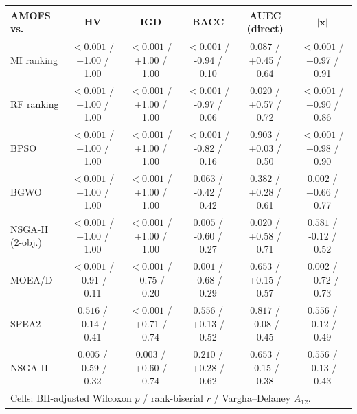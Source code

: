 \begin{tabular}{lccccc}
\toprule
AMOFS vs. & HV & IGD & BACC & AUEC (direct) & $|\mathbf{x}|$ \\
\midrule
MI ranking & $<\!0.001$ / +1.00 / 1.00 & $<\!0.001$ / +1.00 / 1.00 & $<\!0.001$ / -0.94 / 0.10 & $0.087$ / +0.45 / 0.64 & $<\!0.001$ / +0.97 / 0.91 \\
RF ranking & $<\!0.001$ / +1.00 / 1.00 & $<\!0.001$ / +1.00 / 1.00 & $<\!0.001$ / -0.97 / 0.06 & $0.020$ / +0.57 / 0.72 & $<\!0.001$ / +0.90 / 0.86 \\
BPSO & $<\!0.001$ / +1.00 / 1.00 & $<\!0.001$ / +1.00 / 1.00 & $<\!0.001$ / -0.82 / 0.16 & $0.903$ / +0.03 / 0.50 & $<\!0.001$ / +0.98 / 0.90 \\
BGWO & $<\!0.001$ / +1.00 / 1.00 & $<\!0.001$ / +1.00 / 1.00 & $0.063$ / -0.42 / 0.42 & $0.382$ / +0.28 / 0.61 & $0.002$ / +0.66 / 0.77 \\
NSGA-II (2-obj.) & $<\!0.001$ / +1.00 / 1.00 & $<\!0.001$ / +1.00 / 1.00 & $0.005$ / -0.60 / 0.27 & $0.020$ / +0.58 / 0.71 & $0.581$ / -0.12 / 0.52 \\
MOEA/D & $<\!0.001$ / -0.91 / 0.11 & $<\!0.001$ / -0.75 / 0.20 & $0.001$ / -0.68 / 0.29 & $0.653$ / +0.15 / 0.57 & $0.002$ / +0.72 / 0.73 \\
SPEA2 & $0.516$ / -0.14 / 0.41 & $<\!0.001$ / +0.71 / 0.74 & $0.556$ / +0.13 / 0.52 & $0.817$ / -0.08 / 0.45 & $0.556$ / -0.12 / 0.49 \\
NSGA-II & $0.005$ / -0.59 / 0.32 & $0.003$ / +0.60 / 0.74 & $0.210$ / +0.28 / 0.62 & $0.653$ / -0.15 / 0.38 & $0.556$ / -0.13 / 0.43 \\
\bottomrule
\multicolumn{6}{l}{\footnotesize Cells: BH-adjusted Wilcoxon $p$ / rank-biserial $r$ / Vargha--Delaney $\hat A_{12}$.} \\
\end{tabular}
